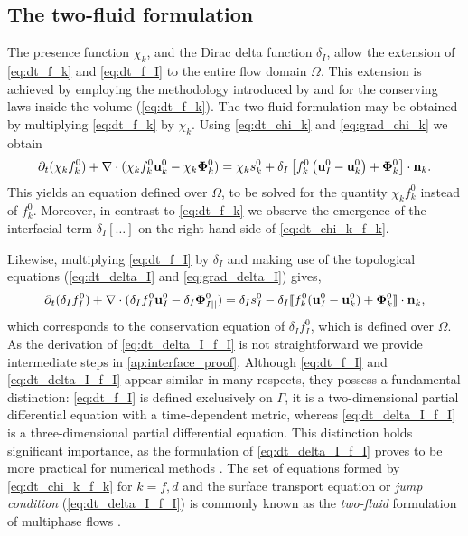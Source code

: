 \subsection{The two-fluid formulation}
The presence function $\chi_k$, and the Dirac delta function $\delta_I$, allow the extension of \ref{eq:dt_f_k} and \ref{eq:dt_f_I} to the entire flow domain $\Omega$. 
This extension is achieved by employing the methodology introduced by \citet{drew1983mathematical} and \citet{kataoka1986local} for the conserving laws inside the volume (\ref{eq:dt_f_k}).
The two-fluid formulation may be obtained by multiplying \ref{eq:dt_f_k} by $\chi_k$. 
Using \ref{eq:dt_chi_k} and \ref{eq:grad_chi_k} we obtain
\begin{equation}
    \partial_t (\chi_k f_k^0)
    + \mathbf{\nabla}\cdot (
        \chi_k f_k^0 \textbf{u}_k^0
        - \chi_k \mathbf{\Phi}_k^0 
        )
    = 
    \chi_k s_k^0
    + \delta_I\left[
        f_k^0
        \left(
            \textbf{u}_I^0
            - \textbf{u}_k^0
        \right)
        + \mathbf{\Phi}_k^0
    \right]
    \cdot \textbf{n}_k.
    \label{eq:dt_chi_k_f_k}
\end{equation}
This yields an equation defined over $\Omega$, to be solved for the quantity $\chi_k f_k^0$ instead of $f_k^0$. 
Moreover, in contrast to \ref{eq:dt_f_k} we observe the emergence of the interfacial term $ \delta_I[\ldots]$ on the right-hand side of \ref{eq:dt_chi_k_f_k}. 

Likewise, multiplying \ref{eq:dt_f_I} by $\delta_I$ and making use of the topological equations (\ref{eq:dt_delta_I} and \ref{eq:grad_delta_I}) gives,
\begin{equation}
    \partial_t (\delta_If_I^0)  
    + \mathbf{\nabla}\cdot (
        \delta_I f_I^0 \textbf{u}_I^0
        - \delta_I \mathbf{\Phi}_{I||}^0 
        )
    = 
    \delta_Is_I^0
    - \delta_I\llbracket 
    f_k^0 (\textbf{u}_I^0 - \textbf{u}_k^0)
    + \mathbf{\Phi}_k^0 \rrbracket \cdot \textbf{n}_k,
    \label{eq:dt_delta_I_f_I}
\end{equation}
which corresponds to the conservation equation of $\delta_If_I^0$, which is defined over $\Omega$.
As the derivation of \ref{eq:dt_delta_I_f_I} is not straightforward we provide intermediate steps in \ref{ap:interface_proof}. 
Although \ref{eq:dt_f_I} and \ref{eq:dt_delta_I_f_I} appear similar in many respects, they possess a fundamental distinction: \ref{eq:dt_f_I} is defined exclusively on $\Gamma$, it is a two-dimensional partial differential equation with a time-dependent metric, whereas \ref{eq:dt_delta_I_f_I} is a three-dimensional partial differential equation. 
This distinction holds significant importance, as the formulation of \ref{eq:dt_delta_I_f_I} proves to be more practical for numerical methods \citep{scorsim2021particle}. 
The set of equations formed by \ref{eq:dt_chi_k_f_k} for $k = f,d$ and the surface transport equation or \textit{jump condition} (\ref{eq:dt_delta_I_f_I}) is commonly known as the \textit{two-fluid} formulation of multiphase flows \citep{morel2015mathematical,tryggvason2011direct,drew1983mathematical,kataoka1986local}. 

